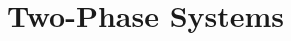 \documentclass[10pt,compress,handout,unknownkeysallowed]{beamer}
\begin{document}

\section{Two-Phase Systems}

\end{document}
